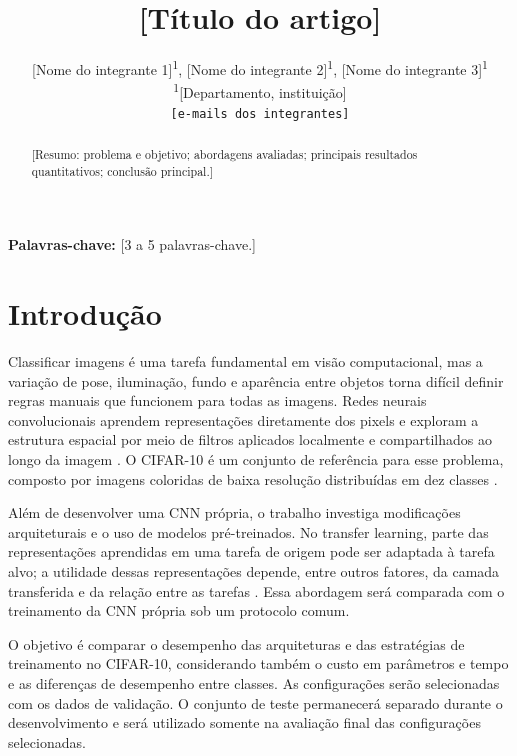 \documentclass[10pt,a4paper]{article}
\title{\vspace{-1.2cm}\Large\bfseries [Título do artigo]}
\author{
    [Nome do integrante 1]\textsuperscript{1},
    [Nome do integrante 2]\textsuperscript{1},
    [Nome do integrante 3]\textsuperscript{1}\\[3pt]
    \small \textsuperscript{1}[Departamento, instituição]\\
    \small \texttt{[e-mails dos integrantes]}
}
\date{}
\begin{document}
\maketitle
\vspace{-0.8cm}

\begin{abstract}
[Resumo: problema e objetivo; abordagens avaliadas; principais resultados quantitativos; conclusão principal.]
\end{abstract}

\noindent\textbf{Palavras-chave:} [3 a 5 palavras-chave.]

\section{Introdução}

Classificar imagens é uma tarefa fundamental em visão computacional, mas a
variação de pose, iluminação, fundo e aparência entre objetos torna difícil
definir regras manuais que funcionem para todas as imagens. Redes neurais
convolucionais aprendem representações diretamente dos pixels e exploram a
estrutura espacial por meio de filtros aplicados localmente e compartilhados
ao longo da imagem \cite{lecun1998}. O CIFAR-10 é um conjunto de referência
para esse problema, composto por imagens coloridas de baixa resolução
distribuídas em dez classes \cite{krizhevsky2009}.

Além de desenvolver uma CNN própria, o trabalho investiga modificações
arquiteturais e o uso de modelos pré-treinados. No transfer learning, parte das
representações aprendidas em uma tarefa de origem pode ser adaptada à tarefa
alvo; a utilidade dessas representações depende, entre outros fatores, da
camada transferida e da relação entre as tarefas \cite{yosinski2014}. Essa
abordagem será comparada com o treinamento da CNN própria sob um protocolo
comum.

O objetivo é comparar o desempenho das arquiteturas e das estratégias de
treinamento no CIFAR-10, considerando também o custo em parâmetros e tempo e
as diferenças de desempenho entre classes. As configurações serão selecionadas
com os dados de validação. O conjunto de teste permanecerá separado durante o
desenvolvimento e será utilizado somente na avaliação final das configurações
selecionadas.
\end{document}
